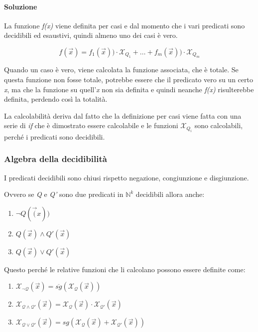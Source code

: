 \paragraph{Soluzione}\label{soluzione-esercizio}

La funzione \emph{f(x)} viene definita per casi e dal momento che i vari
predicati sono decidibili ed esaustivi, quindi almeno uno dei casi è
vero.

$$
f(\vec{x}) = f_1(\vec{x}))\cdot \mathcal{X}_{Q_1} + \ldots +	 f_m(\vec{x}))\cdot \mathcal{X}_{Q_m}
$$

Quando un caso è vero, viene calcolata la funzione associata, che è
totale. Se questa funzione non fosse totale, potrebbe essere che il
predicato vero su un certo \emph{x}, ma che la funzione su
quell'\emph{x} non sia definita e quindi neanche \emph{f(x)}
risulterebbe definita, perdendo così la totalità.

La calcolabilità deriva dal fatto che la definizione per casi viene
fatta con una serie di \emph{if} che è dimostrato essere calcolabile e
le funzioni $\mathcal{X}_{Q_i}$ sono calcolabili, perché i predicati sono
decidibili.

\subsubsection{Algebra della decidibilità}\label{algebra-della-decibilituxe0}

I predicati decidibili sono chiusi rispetto negazione, congiunzione e
disgiunzione.

Ovvero se \textit{Q} e \textit{Q'} sono due predicati in $\mathbb{N}^k$ decidibili allora anche:

\begin{enumerate}
\item $\neg Q(\vec(x))$
\item $ Q(\vec{x}) \wedge Q'(\vec{x})$
\item $ Q(\vec{x}) \vee Q'(\vec{x}) $
\end{enumerate}

Questo perché le relative funzioni che li calcolano possono essere definite come:

\begin{enumerate}
	\item $ \mathcal{X_{\neg Q}}(\vec{x}) = \overline{sg}( \mathcal{X_{Q}}(\vec{x})) $
	\item $ \mathcal{X_{Q \wedge Q'}}(\vec{x})= \mathcal{X_{Q}}(\vec{x}) \cdot \mathcal{X_{Q'}}(\vec{x})$
	\item $ \mathcal{X_{Q \vee Q'}}(\vec{x})= sg(\mathcal{X_{Q}}(\vec{x}) + \mathcal{X_{Q'}}(\vec{x}))$
\end{enumerate}


